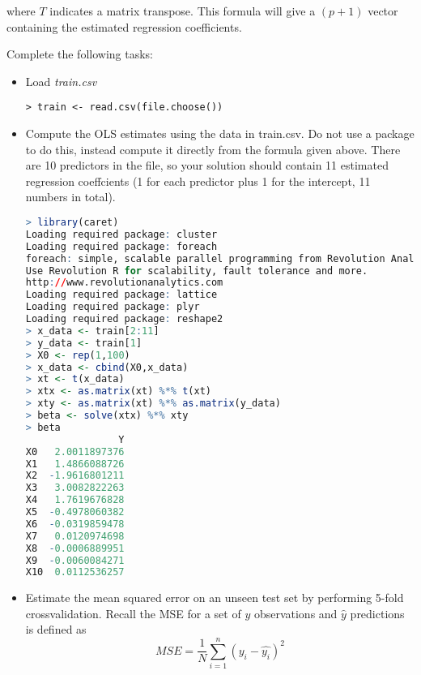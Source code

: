 \documentclass[fontsize=10pt,DIV=14]{scrartcl}
\begin{document}
\begin{enumerate}
		where $T$ indicates a matrix transpose. This formula will give a $(p + 1)$ vector containing the estimated regression coeﬃcients.

		Complete the following tasks:
		\begin{itemize}
			\item
			Load \emph{train.csv}

\begin{verbatim}
> train <- read.csv(file.choose())
\end{verbatim}
			
			\item
			Compute the OLS estimates using the data in train.csv. Do not use a package to do this, instead compute it directly from the formula given above. There are 10 predictors in the ﬁle, so your solution should contain 11 estimated regression coeffcients (1 for each predictor plus 1 for the intercept, 11 numbers in total).

			\begin{lstlisting}[language=R,frame=single]
> library(caret)
Loading required package: cluster
Loading required package: foreach
foreach: simple, scalable parallel programming from Revolution Analytics
Use Revolution R for scalability, fault tolerance and more.
http://www.revolutionanalytics.com
Loading required package: lattice
Loading required package: plyr
Loading required package: reshape2
> x_data <- train[2:11]
> y_data <- train[1]
> X0 <- rep(1,100)
> x_data <- cbind(X0,x_data)
> xt <- t(x_data)
> xtx <- as.matrix(xt) %*% t(xt)
> xty <- as.matrix(xt) %*% as.matrix(y_data)
> beta <- solve(xtx) %*% xty
> beta
                Y
X0   2.0011897376
X1   1.4866088726
X2  -1.9616801211
X3   3.0082822263
X4   1.7619676828
X5  -0.4978060382
X6  -0.0319859478
X7   0.0120974698
X8  -0.0006889951
X9  -0.0060084271
X10  0.0112536257
			\end{lstlisting}

			\item
			Estimate the mean squared error on an unseen test set by performing 5-fold crossvalidation. Recall the MSE for a set of $y$ observations and $\hat{y}$ predictions is deﬁned as
			\begin{equation*}
				MSE = \frac{1}{N} \sum_{i=1}^{n} (y_{i} - \hat{y_{i}})^{2}
			\end{equation*}


\end{itemize}
\end{enumerate}
\end{document}
